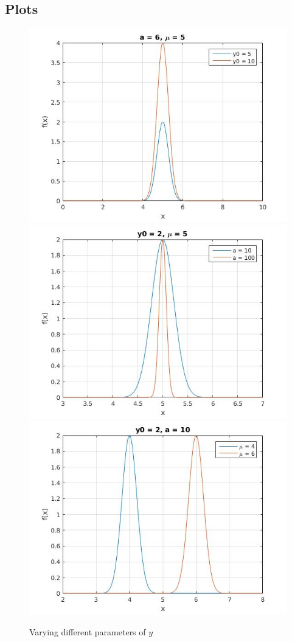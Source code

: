 \documentclass{article}
\begin{document}
\subsection{Plots}
\begin{figure}[!h]
    \centering
    \includegraphics[scale = 0.4]{6}
    \includegraphics[scale = 0.4]{7}
    \includegraphics[scale = 0.4]{8}
    \caption{Varying different parameters of $y$}
    \label{fig:gaussian}
\end{figure}
\end{document}
